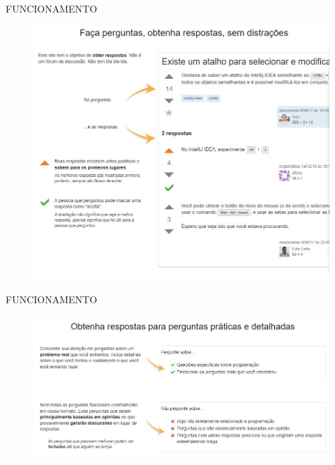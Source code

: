 \documentclass{Alexandre}
\begin{document}
\begin{frame}{FUNCIONAMENTO}

    \begin{figure}
        \includegraphics[scale = 0.35]{Figuras/StackOverflow-Perguntas.jpg}
    \end{figure}

\end{frame}


\begin{frame}{FUNCIONAMENTO}

    \begin{figure}
        \includegraphics[scale = 0.4]{Figuras/StackOverflow-Respostas.jpg}
    \end{figure}

\end{frame}
\end{document}
